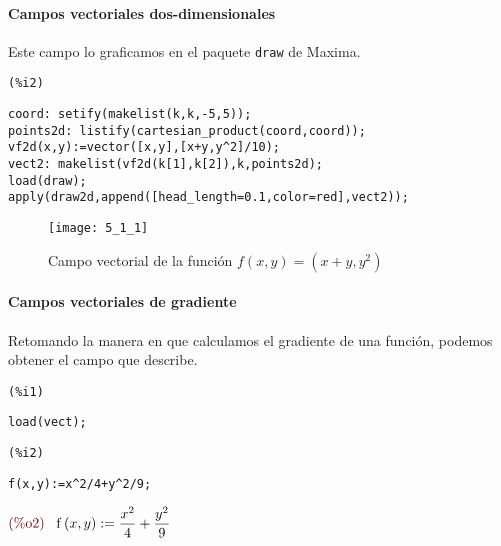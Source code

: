 \documentclass[12pt]{article}
\begin{document}
\paragraph{Campos vectoriales dos-dimensionales} Este campo lo graficamos en el paquete \texttt{draw} de Maxima.

\noindent
\begin{minipage}[t]{8ex}{\color{red}\bf
\begin{verbatim}
(%i2) 
\end{verbatim}}
\end{minipage}
\begin{minipage}[t]{\textwidth}{\color{blue}
\begin{verbatim}
coord: setify(makelist(k,k,-5,5));
points2d: listify(cartesian_product(coord,coord));
vf2d(x,y):=vector([x,y],[x+y,y^2]/10);
vect2: makelist(vf2d(k[1],k[2]),k,points2d);
load(draw);
apply(draw2d,append([head_length=0.1,color=red],vect2));
\end{verbatim}}
\end{minipage}
\begin{figure}[H]
\centering
\texttt{[image: 5\_1\_1]}
\caption{Campo vectorial de la función $f(x,y)=(x+y,y^2)$}
\end{figure}

\paragraph{Campos vectoriales de gradiente} Retomando la manera en que calculamos el gradiente de una función, podemos obtener el campo que describe.

\noindent
\begin{minipage}[t]{8ex}{\color{red}\bf
\begin{verbatim}
(%i1) 
\end{verbatim}}
\end{minipage}
\begin{minipage}[t]{\textwidth}{\color{blue}
\begin{verbatim}
load(vect);
\end{verbatim}}
\end{minipage}


\noindent
\begin{minipage}[t]{8ex}{\color{red}\bf
\begin{verbatim}
(%i2) 
\end{verbatim}}
\end{minipage}
\begin{minipage}[t]{\textwidth}{\color{blue}
\begin{verbatim}
f(x,y):=x^2/4+y^2/9;
\end{verbatim}}
\end{minipage}
\begin{math}\displaystyle
\parbox{8ex}{\color{labelcolor}(\%o2) }
\mathrm{f}\left( x,y\right) :=\frac{{x}^{2}}{4}+\frac{{y}^{2}}{9}
\end{math}
\end{document}
